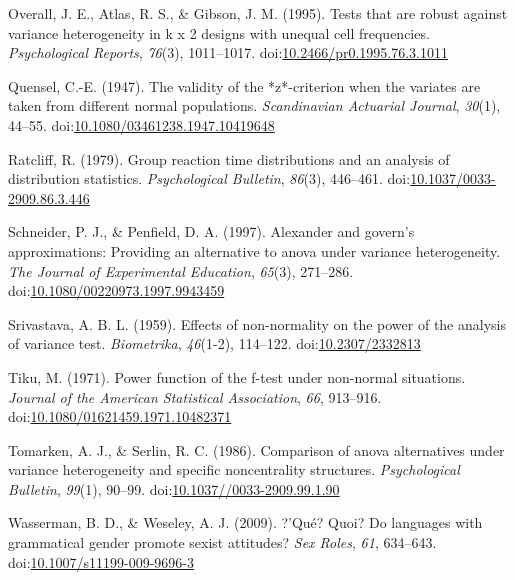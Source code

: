 \documentclass[man,floatsintext]{apa6}
\begin{document}
\leavevmode\hypertarget{ref-Overall_et_al_1995}{}%
Overall, J. E., Atlas, R. S., \& Gibson, J. M. (1995). Tests that are robust against variance heterogeneity in k x 2 designs with unequal cell frequencies. \emph{Psychological Reports}, \emph{76}(3), 1011--1017. doi:\href{https://doi.org/10.2466/pr0.1995.76.3.1011}{10.2466/pr0.1995.76.3.1011}

\leavevmode\hypertarget{ref-Quensel_1947}{}%
Quensel, C.-E. (1947). The validity of the *z*-criterion when the variates are taken from different normal populations. \emph{Scandinavian Actuarial Journal}, \emph{30}(1), 44--55. doi:\href{https://doi.org/10.1080/03461238.1947.10419648}{10.1080/03461238.1947.10419648}

\leavevmode\hypertarget{ref-Ratcliff_1979}{}%
Ratcliff, R. (1979). Group reaction time distributions and an analysis of distribution statistics. \emph{Psychological Bulletin}, \emph{86}(3), 446--461. doi:\href{https://doi.org/10.1037/0033-2909.86.3.446}{10.1037/0033-2909.86.3.446}

\leavevmode\hypertarget{ref-Schneider_and_Penfield_1997}{}%
Schneider, P. J., \& Penfield, D. A. (1997). Alexander and govern's approximations: Providing an alternative to anova under variance heterogeneity. \emph{The Journal of Experimental Education}, \emph{65}(3), 271--286. doi:\href{https://doi.org/10.1080/00220973.1997.9943459}{10.1080/00220973.1997.9943459}

\leavevmode\hypertarget{ref-Srivastava_1959}{}%
Srivastava, A. B. L. (1959). Effects of non-normality on the power of the analysis of variance test. \emph{Biometrika}, \emph{46}(1-2), 114--122. doi:\href{https://doi.org/10.2307/2332813}{10.2307/2332813}

\leavevmode\hypertarget{ref-Tiku_1971}{}%
Tiku, M. (1971). Power function of the f-test under non-normal situations. \emph{Journal of the American Statistical Association}, \emph{66}, 913--916. doi:\href{https://doi.org/10.1080/01621459.1971.10482371}{10.1080/01621459.1971.10482371}

\leavevmode\hypertarget{ref-Tomarken_and_Serlin_1986}{}%
Tomarken, A. J., \& Serlin, R. C. (1986). Comparison of anova alternatives under variance heterogeneity and specific noncentrality structures. \emph{Psychological Bulletin}, \emph{99}(1), 90--99. doi:\href{https://doi.org/10.1037//0033-2909.99.1.90}{10.1037//0033-2909.99.1.90}

\leavevmode\hypertarget{ref-Wasserman_and_Weseley_2009}{}%
Wasserman, B. D., \& Weseley, A. J. (2009). ?'Qué? Quoi? Do languages with grammatical gender promote sexist attitudes? \emph{Sex Roles}, \emph{61}, 634--643. doi:\href{https://doi.org/10.1007/s11199-009-9696-3}{10.1007/s11199-009-9696-3}
\end{document}
